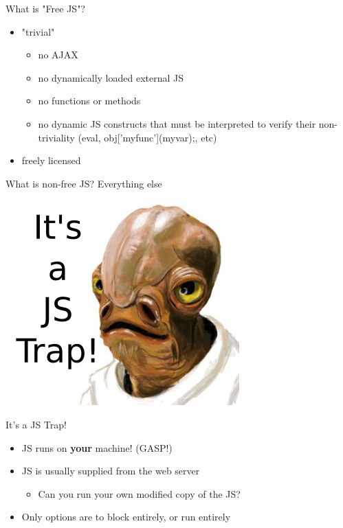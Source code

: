 \documentclass[11pt]{beamer}
\begin{document}
\begin{frame}{What is "Free JS"?}
\begin{itemize}
\item "trivial"\pause
\begin{itemize}
\item no AJAX\pause
\item no dynamically loaded external JS\pause
\item no functions or methods\pause
\item no dynamic JS constructs that must be interpreted to verify their non-triviality (eval, obj['myfunc'](myvar);, etc)\pause
\end{itemize}
\item freely licensed
\end{itemize}
\end{frame}

\begin{frame}{What is non-free JS?}
Everything else
\end{frame}

{ %
    \begin{frame}[plain]
 		\includegraphics[keepaspectratio=true,width=\paperwidth]{its_a_trap.png}
    \end{frame}
}

\begin{frame}{It's a JS Trap!}
\begin{itemize}
\item JS runs on \textbf{your} machine! (GASP!)\pause
\item JS is usually supplied from the web server\pause
\begin{itemize}
\item Can you run your own modified copy of the JS?\pause
\end{itemize}
\item Only options are to block entirely, or run entirely
\end{itemize}
\end{frame}
\end{document}
